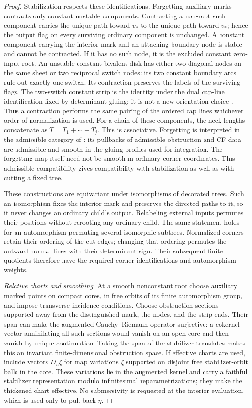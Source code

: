 \documentclass[11pt]{article}
\numberwithin{equation}{section}
\theoremstyle{definition}
\theoremstyle{remark}
\begin{document}
\begin{proof}
Stabilization respects these identifications.  Forgetting auxiliary
marks contracts only constant unstable components.  Contracting a
non-root such component carries the unique path toward $v_*$ to the
unique path toward $v_*$; hence the output flag on every surviving
ordinary component is unchanged.  A constant component carrying the
interior mark and an attaching boundary node is stable and cannot
be contracted.  If it has no such node, it is the excluded constant
zero-input root.  An unstable constant bivalent disk has either two
diagonal nodes on the same sheet or two reciprocal switch nodes:
its two constant boundary arcs rule out exactly one switch.  Its
contraction preserves the labels of the surviving flags.  The
two-switch constant strip is the identity under the dual cap-line
identification fixed by determinant gluing; it is not a new
orientation choice \cite[Sections~4.3 and~5]{AkahoJoyce}.
Thus a contraction performs the same pairing
of the ordered cap lines whichever order of normalization is used.
For a chain of these components, the neck lengths concatenate as
$T=T_1+\cdots+T_j$.  This is associative.  Forgetting is interpreted
in the admissible category of \cite[Section~14.3]{AFOOO2026}:
its pullbacks of admissible obstruction and CF data are admissible
and smooth in the gluing profiles used for integration.  The
forgetting map itself need not be smooth in ordinary corner
coordinates.  This admissible compatibility gives compatibility
with stabilization as well as with cutting a fixed tree.

These constructions are equivariant under isomorphisms of decorated
trees.  Such an isomorphism fixes the interior mark and preserves
the directed paths to it, so it never changes an ordinary child's
output.  Relabeling external inputs permutes their positions without
rerooting any ordinary child.  The same statement holds for an
automorphism permuting several isomorphic subtrees.  Normalized
corners retain their ordering of the cut edges; changing that
ordering permutes the outward normal lines with their determinant
sign.  Their subsequent finite quotients therefore have the required
corner identifications and automorphism weights.

\emph{Relative charts and smoothing.}
At a smooth nonconstant root choose auxiliary marked points on
compact cores, in free orbits of its finite automorphism group,
and impose transverse incidence conditions.  Choose obstruction
sections supported away from the distinguished mark, the nodes,
and the strip ends.  Their span can make the augmented
Cauchy--Riemann operator surjective: a cokernel vector annihilating
all such sections would vanish on an open core and then vanish by
unique continuation.  Taking the span of the stabilizer translates
makes this an invariant finite-dimensional obstruction space.
If effective charts are used, include vectors $D_u\xi$ for map
variations $\xi$ supported on disjoint free stabilizer-orbit balls
in the core.  These variations lie in the augmented kernel and
carry a faithful stabilizer representation modulo infinitesimal
reparametrizations; they make the thickened chart effective.
No submersivity is requested at the interior evaluation, which is
used only to pull back $\eta$.


\end{proof}
\end{document}
